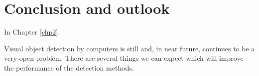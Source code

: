 \chapter{Conclusion and outlook}
\label{chp6}

In Chapter \ref{chp2}.

Visual object detection by computers is still and, in near future, continues to be a very open problem. There are several things we can expect which will improve the performance of the detection methods. 
